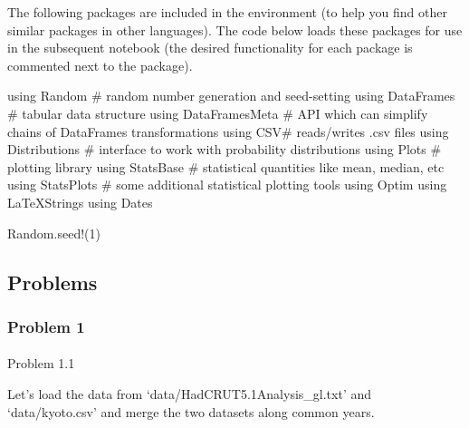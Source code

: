 \documentclass[
  letterpaper,
  DIV=11,
  numbers=noendperiod]{scrartcl}
\makeatletter
\let\oldparagraph\paragraph
\renewcommand{\paragraph}{
    \@ifstar
      \xxxParagraphStar
      \xxxParagraphNoStar
  }
\newcommand{\xxxParagraphStar}[1]{\oldparagraph*{#1}\mbox{}}
\newcommand{\xxxParagraphNoStar}[1]{\oldparagraph{#1}\mbox{}}
\newenvironment{Shaded}{\begin{snugshade}}{\end{snugshade}}
\newcommand{\BuiltInTok}[1]{\textcolor[rgb]{0.00,0.23,0.31}{#1}}
\newcommand{\CommentTok}[1]{\textcolor[rgb]{0.37,0.37,0.37}{#1}}
\newcommand{\FloatTok}[1]{\textcolor[rgb]{0.68,0.00,0.00}{#1}}
\newcommand{\FunctionTok}[1]{\textcolor[rgb]{0.28,0.35,0.67}{#1}}
\newcommand{\ImportTok}[1]{\textcolor[rgb]{0.00,0.46,0.62}{#1}}
\newcommand{\NormalTok}[1]{\textcolor[rgb]{0.00,0.23,0.31}{#1}}
\makeatother
\begin{document}
The following packages are included in the environment (to help you find
other similar packages in other languages). The code below loads these
packages for use in the subsequent notebook (the desired functionality
for each package is commented next to the package).

\begin{Shaded}
\begin{Highlighting}[]
\ImportTok{using} \BuiltInTok{Random} \CommentTok{\# random number generation and seed{-}setting}
\ImportTok{using} \BuiltInTok{DataFrames} \CommentTok{\# tabular data structure}
\ImportTok{using} \BuiltInTok{DataFramesMeta} \CommentTok{\# API which can simplify chains of DataFrames transformations}
\ImportTok{using} \BuiltInTok{CSV\#}\NormalTok{ reads/writes .csv files}
\ImportTok{using} \BuiltInTok{Distributions} \CommentTok{\# interface to work with probability distributions}
\ImportTok{using} \BuiltInTok{Plots} \CommentTok{\# plotting library}
\ImportTok{using} \BuiltInTok{StatsBase} \CommentTok{\# statistical quantities like mean, median, etc}
\ImportTok{using} \BuiltInTok{StatsPlots} \CommentTok{\# some additional statistical plotting tools}
\ImportTok{using} \BuiltInTok{Optim}
\ImportTok{using} \BuiltInTok{LaTeXStrings}
\ImportTok{using} \BuiltInTok{Dates}

\BuiltInTok{Random}\NormalTok{.}\FunctionTok{seed!}\NormalTok{(}\FloatTok{1}\NormalTok{)}
\end{Highlighting}
\end{Shaded}

\subsection{Problems}\label{problems}

\subsubsection{Problem 1}\label{problem-1}

\paragraph{Problem 1.1}\label{problem-1.1}

Let's load the data from `data/HadCRUT5.1Analysis\_gl.txt' and
`data/kyoto.csv' and merge the two datasets along common years.
\end{document}
